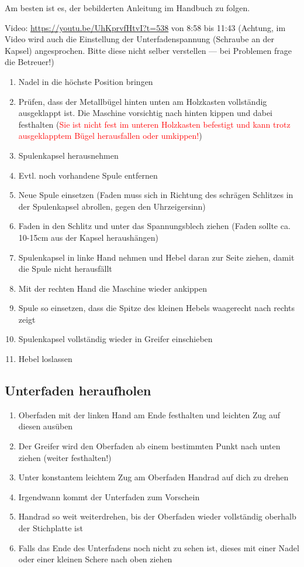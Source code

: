 \documentclass{\basedir/fablab-document}
\begin{document}
Am besten ist es, der bebilderten Anleitung im Handbuch zu folgen.

Video: \url{https://youtu.be/UhKprvfHtvI?t=538} von 8:58 bis 11:43 (Achtung, im Video wird auch die Einstellung der Unterfadenspannung (Schraube an der Kapsel) angesprochen. Bitte diese nicht selber verstellen --- bei Problemen frage die Betreuer!)


\vspace{1em}
\begin{enumerate}
 \item Nadel in die höchste Position bringen
 \item Prüfen, dass der Metallbügel hinten unten am Holzkasten vollständig ausgeklappt ist. Die Maschine vorsichtig nach hinten kippen und dabei festhalten (\textcolor{red}{Sie ist nicht fest im unteren Holzkasten befestigt und kann trotz ausgeklapptem Bügel herausfallen oder umkippen!})
 \item Spulenkapsel herausnehmen
 \item Evtl. noch vorhandene Spule entfernen
 \item Neue Spule einsetzen (Faden muss sich in Richtung des schrägen Schlitzes in der Spulenkapsel abrollen, gegen den Uhrzeigersinn)
 \item Faden in den Schlitz und unter das Spannungsblech ziehen (Faden sollte ca. 10-15cm aus der Kapsel heraushängen)
 \item Spulenkapsel in linke Hand nehmen und Hebel daran zur Seite ziehen, damit die Spule nicht herausfällt
 \item Mit der rechten Hand die Maschine wieder ankippen
 \item Spule so einsetzen, dass die Spitze des kleinen Hebels waagerecht nach rechts zeigt
 \item Spulenkapsel vollständig wieder in Greifer einschieben
 \item Hebel loslassen
\end{enumerate}


\subsection{Unterfaden heraufholen}
\begin{enumerate}
	\item Oberfaden mit der linken Hand am Ende festhalten und leichten Zug auf diesen ausüben
	\item Der Greifer wird den Oberfaden ab einem bestimmten Punkt nach unten ziehen (weiter festhalten!)
	\item Unter konstantem leichtem Zug am Oberfaden Handrad auf dich zu drehen
	\item Irgendwann kommt der Unterfaden zum Vorschein
	\item Handrad so weit weiterdrehen, bis der Oberfaden wieder vollständig oberhalb der Stichplatte ist
	\item Falls das Ende des Unterfadens noch nicht zu sehen ist, dieses mit einer Nadel oder einer kleinen Schere nach oben ziehen
\end{enumerate}
\end{document}
